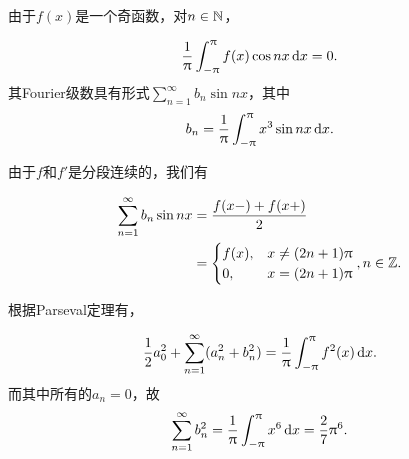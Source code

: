 \begin{ans}
  \begin{enumb}
    \item 由于$f(x)$是一个奇函数，对$n\in\mathbb N$，
  \end{enumb}
  \[ \frac1{\uppi}\int_{-\uppi}^\uppi f(x)\cos nx\,\mathrm dx = 0. \]
  其Fourier级数具有形式$\sum_{n=1}^\infty b_n\sin nx$，其中
  \[
    b_n=\frac1{\uppi}\int_{-\uppi}^\uppi x^3\sin nx\,\mathrm dx.
  \]
  \begin{enumc}
    \setcounter{enumi}{1}
    \item 由于$f$和$f'$是分段连续的，我们有
  \end{enumc}
      \begin{align*}
        \sum_{n=1}^\infty b_n\sin nx
        & = \frac{f(x-)+f(x+)}2 \\
        & = \begin{cases}
          f(x), & x\ne (2n+1)\uppi\\
          0, & x= (2n+1)\uppi
        \end{cases},n\in\mathbb Z.
      \end{align*}
  \begin{enumc}
    \setcounter{enumi}{2}
    \item 根据Parseval定理有，
  \end{enumc}
  \[
    \frac12a_0^2 + \sum_{n=1}^\infty (a_n^2+b_n^2)
    = \frac1{\uppi}\int_{-\uppi}^\uppi f^2(x)\,\mathrm dx.
  \]
  而其中所有的$a_n=0$，故
  \[
    \sum_{n=1}^\infty b_n^2= \frac1{\uppi}\int_{-\uppi}^\uppi
    x^6\,\mathrm dx = \frac27\uppi^6.
  \]
\end{ans}




